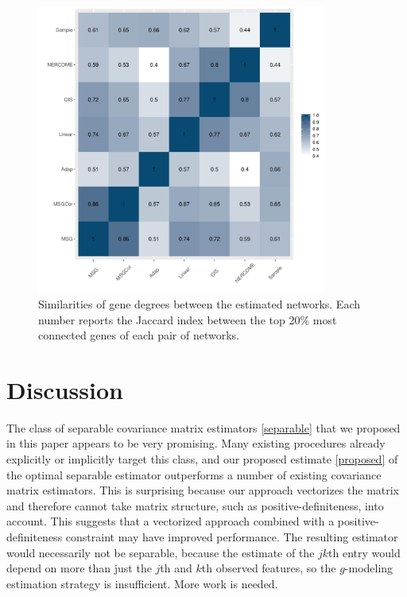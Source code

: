 \documentclass[useAMS,referee,usenatbib]{biom}
\begin{document}
\begin{figure}
\begin{center}
\centerline{\includegraphics[width=0.85\textwidth]{img/top20.pdf}}
\end{center}
\caption{Similarities of gene degrees between the estimated networks. Each number reports the Jaccard index between the top 20\% most connected genes of each pair of networks.}
\label{top20}
\end{figure}

\section{\label{sec:discussion}Discussion}
\label{discussion}

The class of separable covariance matrix estimators \eqref{separable} that we proposed in this paper appears to be very promising. Many existing procedures already explicitly or implicitly target this class, and our proposed estimate \eqref{proposed} of the optimal separable estimator outperforms a number of existing covariance matrix estimators. This is surprising because our approach vectorizes the matrix and therefore cannot take matrix structure, such as positive-definiteness, into account. This suggests that a vectorized approach combined with a positive-definiteness constraint may have improved performance. The resulting estimator would necessarily not be separable, because the estimate of the $jk$th entry would depend on more than just the $j$th and $k$th observed features, so the $g$-modeling estimation strategy is insufficient. More work is needed.
\end{document}
